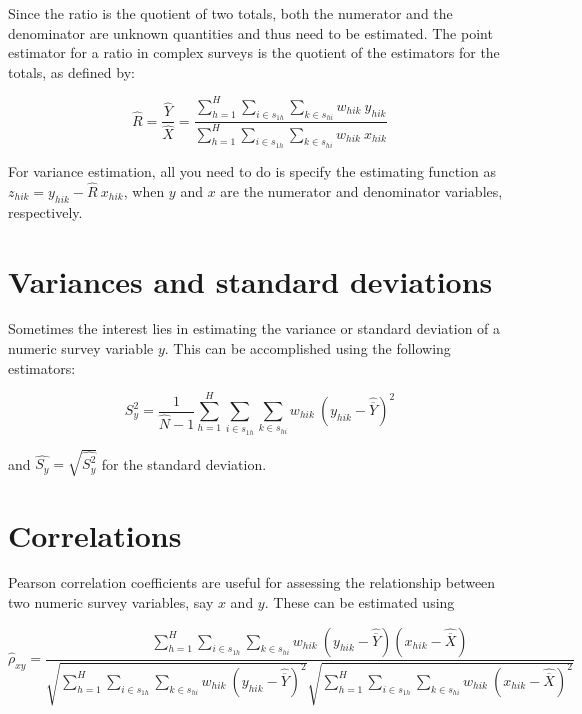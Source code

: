 \documentclass[
  12pt,
]{book}
\begin{document}
Since the ratio is the quotient of two totals, both the numerator and the denominator are unknown quantities and thus need to be estimated. The point estimator for a ratio in complex surveys is the quotient of the estimators for the totals, as defined by:

\[
\widehat{R} = \frac{\widehat{Y}}{\widehat{X}}
= \frac{\sum_{h=1}^{H}\sum_{i \in s_{1h}} \sum_{ k \in s_{hi}}  w_{hik} \ y_{hik}}{\sum_{h=1}^{H}\sum_{i \in s_{1h}} \sum_{ k \in s_{hi}}  w_{hik} \ x_{hik}}
\]

For variance estimation, all you need to do is specify the estimating function as \(z_{hik} = y_{hik} - \widehat{R} \ x_{hik}\), when \(y\) and \(x\) are the numerator and denominator variables, respectively.

\hypertarget{variances-and-standard-deviations}{%
\section{Variances and standard deviations}\label{variances-and-standard-deviations}}

Sometimes the interest lies in estimating the variance or standard deviation of a numeric survey variable \(y\). This can be accomplished using the following estimators:

\[
\widehat{S_y^2} = \frac{1}{\widehat{N}-1}
{\sum_{h=1}^{H}\sum_{i \in s_{1h}} \sum_{ k \in s_{hi}}  w_{hik} \ \left( y_{hik} - \widehat{\overline{Y}} \right)^2}
\]

and \(\widehat{S_y} = \sqrt{\widehat{S_y^2}}\) for the standard deviation.

\hypertarget{correlations}{%
\section{Correlations}\label{correlations}}

Pearson correlation coefficients are useful for assessing the relationship between two numeric survey variables, say \(x\) and \(y\). These can be estimated using

\[
\widehat{\rho}_{xy} = \frac {\sum_{h=1}^{H}\sum_{i \in s_{1h}} \sum_{ k \in s_{hi}}  w_{hik} \ \left( y_{hik} - \widehat{\overline{Y}} \right) \left( x_{hik} - \widehat{\overline{X}} \right)} {\sqrt{\sum_{h=1}^{H}\sum_{i \in s_{1h}} \sum_{ k \in s_{hi}}  w_{hik} \ \left( y_{hik} - \widehat{\overline{Y}} \right)^2} \sqrt{\sum_{h=1}^{H}\sum_{i \in s_{1h}} \sum_{ k \in s_{hi}}  w_{hik} \ \left( x_{hik} - \widehat{\overline{X}} \right)^2}}
\]
\end{document}
